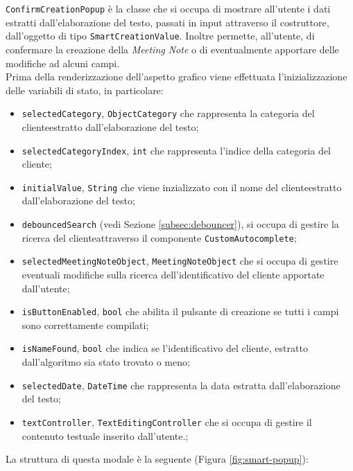 \lstinline{ConfirmCreationPopup} è la classe che si occupa di mostrare all'utente i dati estratti dall'elaborazione del testo, passati in input attraverso il costruttore, dall'oggetto di tipo \lstinline{SmartCreationValue}.
Inoltre permette, all'utente, di confermare la creazione della \emph{Meeting Note} o di eventualmente apportare delle modifiche ad alcuni campi. \\
Prima della renderizzazione dell'aspetto grafico viene effettuata l'inizializzazione delle variabili di stato, in particolare:
\begin{itemize}
    \item \lstinline{selectedCategory}, \lstinline{ObjectCategory} che rappresenta la categoria del \gls{cliente}\glsoccur estratto dall'elaborazione del testo;
    \item \lstinline{selectedCategoryIndex}, \lstinline{int} che rappresenta l'indice della categoria del \gls{cliente}\glsoccur;
    \item \lstinline{initialValue}, \lstinline{String} che viene inzializzato con il nome del \gls{cliente}\glsoccur estratto dall'elaborazione del testo;
    \item \lstinline{debouncedSearch} (vedi Sezione \ref{subsec:debouncer}), si occupa di gestire la ricerca del \gls{cliente}\glsoccur attraverso il componente \lstinline{CustomAutocomplete};
    \item \lstinline{selectedMeetingNoteObject}, \lstinline{MeetingNoteObject} che si occupa di gestire eventuali modifiche sulla ricerca dell'identificativo del cliente apportate dall'utente;
    \item \lstinline{isButtonEnabled}, \lstinline{bool} che abilita il pulsante di creazione se tutti i campi sono correttamente compilati;
    \item \lstinline{isNameFound}, \lstinline{bool} che indica se l'identificativo del \gls{cliente}\glsoccur, estratto dall'algoritmo sia stato trovato o meno;
    \item \lstinline{selectedDate}, \lstinline{DateTime} che rappresenta la data estratta dall'elaborazione del testo;
    \item \lstinline{textController}, \lstinline{TextEditingController} che si occupa di gestire il contenuto testuale inserito dall'utente.;
\end{itemize}
La struttura di questa modale è la seguente (Figura \ref{fig:smart-popup}):
